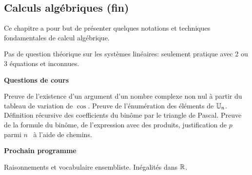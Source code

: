 \subsection{Calculs algébriques (fin)}
Ce chapitre a pour but de présenter quelques notations et techniques fondamentales de calcul algébrique.

\begin{parcolumns}[rulebetween,distance=\parcoldist]{2}
  \colplacechunks
  \colchunk{}
  \colplacechunks
  \colplacechunks
  \colchunk{}
  \colplacechunks

  \end{parcolumns}

\begin{parcolumns}[rulebetween,distance=\parcoldist]{2}
  \colplacechunks
  
  \colchunk{}
  \colplacechunks
  
  \colplacechunks

  \colplacechunks

\end{parcolumns}

\bigskip
Pas de question théorique sur les systèmes linéaires: seulement pratique avec 2 ou 3 équations et inconnues. 
\begin{center}
 \textbf{Questions de cours}
\end{center}
Preuve de l'existence d'un argument d'un nombre complexe non nul à partir du tableau de variation de $\cos$. Preuve de l'énumération des éléments de $\mathbb{U}_n$. Définition récursive des coefficients du binôme par le triangle de Pascal. Preuve de la formule du binôme, de l'expression avec des produits, justification de \og$p$ parmi $n$\fg~ à l'aide de chemins. 

\begin{center}
 \textbf{Prochain programme}
\end{center}
Raisonnements et vocabulaire ensembliste. Inégalités dans $\mathbb{R}$.

